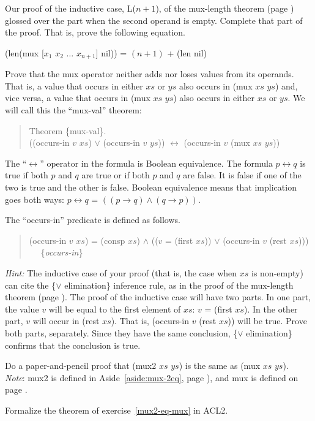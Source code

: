 \begin{ExerciseList}
\Exercise
Our proof of the inductive case, L($n+1$), of the mux-length theorem
(page \pageref{mux-length-thm-induc-case})
glossed over the part when the second operand is empty.
Complete that part of the proof. That is, prove the following equation.

\hspace{1cm} (len(mux [$x_1$ $x_2$ $\dots$ $x_{n+1}$] nil)) = $(n+1)$ + (len nil)

\Exercise [label={ex:mul-val-thm}]
Prove that the mux operator neither adds nor loses values from its operands.
That is, a value that occurs in either $xs$ or $ys$ also occurs in (mux $xs$ $ys$)
and, vice versa, a value that occurs in (mux $xs$ $ys$) also occurs in either $xs$ or $ys$.
We will call this the ``mux-val'' theorem:

\begin{quote}
\label{thm:mux-val}
Theorem \{mux-val\}.\\
((occurs-in $v$ $xs$) $\vee$ (occurs-in $v$ $ys$)) $\leftrightarrow$ (occurs-in $v$ (mux $xs$ $ys$))
\end{quote}

\label{def:equivalence-op}
The ``$\leftrightarrow$'' operator in the formula is Boolean equivalence.
The formula $p \leftrightarrow q$ is true if both $p$ and $q$ are true
or if both $p$ and $q$ are false. It is false if one of the two is true
and the other is false. Boolean equivalence means that implication goes both ways:
$p \leftrightarrow q$ = $((p \rightarrow q) \wedge (q \rightarrow p))$.

The ``occurs-in'' predicate is defined as follows.
\begin{quote}
\label{def:occurs-in}
(occurs-in $v$ $xs$) = (consp $xs$) $\wedge$ (($v$ = (first $xs$)) $\vee$ (occurs-in $v$ (rest $xs$))) ~~ \{\emph{occurs-in}\}
\end{quote}

\emph{Hint:} The inductive case of your proof
(that is, the case when $xs$ is non-empty)
can cite the \{$\vee$ elimination\} inference rule,
as in the proof of the mux-length theorem (page \pageref{mux-length-thm}).
The proof of the inductive case will have two parts.
In one part, the value $v$ will be equal to
the first element of $xs$:
$v$ = (first $xs$).
In the other part, $v$ will occur in (rest $xs$).
That is, (occurs-in $v$ (rest $xs$)) will be true.
Prove both parts, separately.
Since they have the same conclusion,
\{$\vee$ elimination\} confirms that the conclusion is true.

\Exercise
\label{mux2-eq-mux}
Do a paper-and-pencil proof that
(mux2 $xs$ $ys$) is the same as (mux $xs$ $ys$).\\
\emph{Note}: mux2 is defined in
Aside~\ref{aside:mux-2eq}, page \pageref{aside:mux-2eq}),
and mux is defined on page \pageref{mux-defun}.

\Exercise
Formalize the theorem of exercise~\ref{mux2-eq-mux} in ACL2.

\end{ExerciseList}

